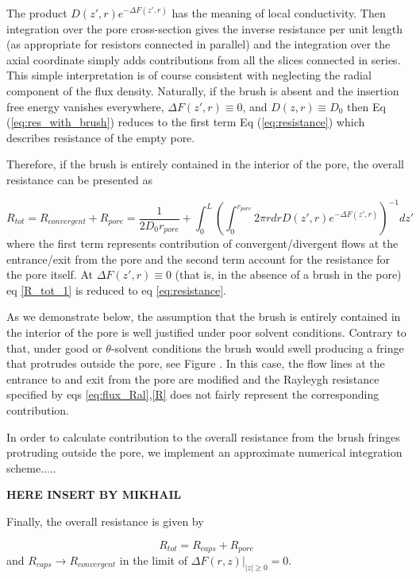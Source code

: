 \documentclass[12pt, a4paper]{article}
\begin{document}
The product $D(z',r)e^{-\Delta F(z',r)}$ has the meaning of local conductivity. 
Then integration over the pore cross-section gives the inverse resistance per unit length 
(as appropriate for resistors connected in parallel) and the integration over the axial coordinate simply adds contributions 
from all the slices connected in series. 
This simple interpretation is of course consistent with neglecting the radial component of the flux density. 
Naturally, if the brush is absent and the insertion free energy vanishes everywhere, $\Delta F(z',r)\equiv 0$, and $D(z,r)\equiv D_0$
then Eq  (\ref{eq:res_with_brush}) reduces to the first term Eq (\ref{eq:resistance}) which describes resistance of the empty pore. 

Therefore, if the brush is entirely contained in the interior of the pore, the overall resistance can be presented as

\begin{equation}
R_{tot}=R_{convergent}+ R_{pore}=\frac{1}{2D_0r_{pore}}+ \int_{0}^{L}\left(\int_{0}^{r_{pore}}2\pi rdrD(z',r)e^{-\Delta F(z',r)}\right)^{-1}dz'
\label{R_tot_1}
\end{equation}
where the first term represents contribution of convergent/divergent flows at the entrance/exit from the pore and the second term
account for the resistance for the pore itself. At $\Delta F(z',r)\equiv 0$ (that is, in the absence of a brush in the pore) eq \ref{R_tot_1} is reduced to eq \ref{eq:resistance}.

As we demonstrate below, the assumption that the brush is entirely contained in the interior of the pore is well justified under poor solvent conditions. 
Contrary to that, under good or $\theta$-solvent conditions the brush would swell producing a fringe that protrudes outside the pore, 
see Figure %
. In this case, the flow lines at the entrance to and exit from the pore are modified and the Rayleygh resistance specified by eqs \ref{eq:flux_Ral},\ref{R} 
does not fairly represent the corresponding contribution. 

In order to calculate contribution to the overall resistance from the brush fringes protruding outside the pore, we implement an approximate numerical integration scheme.....

{\bf HERE INSERT BY MIKHAIL}

Finally, the overall resistance is given by

\begin{equation}
R_{tot}=R_{caps}+R_{pore}
\label{R_tot_tot}
\end{equation}
and $R_{caps}\rightarrow R_{convergent}$ in the limit of $\Delta F(r,z)|_{|z|\geq 0}=0$. 
\end{document}
